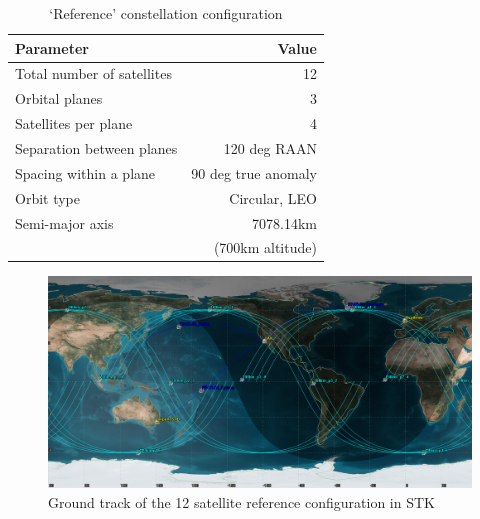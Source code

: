 \begin{table}[htbp]
  \centering
  \caption{`Reference' constellation configuration}
    \begin{tabular}{lr}
    \toprule
    Parameter & Value\\
    \midrule
    Total number of satellites & 12  \\
    Orbital planes	& 3\\
    Satellites per plane & 4\\
    Separation between planes & 120 deg RAAN \\
    Spacing within a plane & 90 deg true anomaly\\
    Orbit type & Circular, LEO \\
    Semi-major axis & 7078.14km \\
    				&(700km altitude)\\

    \bottomrule
    \end{tabular}%
  \label{tab:satRefCase}%
\end{table}%

\begin{figure}[htbp]
	\centering
	\includegraphics[scale = 0.40]{Pictures/12sat_2d.png}
	
	\caption{Ground track of the 12 satellite reference configuration in STK}
	\label{fig:12sat_2d}
\end{figure} 

